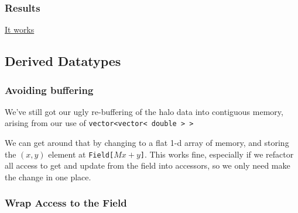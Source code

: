 \subsubsection{Results}\label{results}

\href{https://www.youtube.com/watch?v=3sXO2rYNwl4}{It works}

\subsection{Derived Datatypes}\label{derived-datatypes}

\subsubsection{Avoiding buffering}\label{avoiding-buffering}

We've still got our ugly re-buffering of the halo data into contiguous
memory, arising from our use of
\texttt{vector\textless{}vector\textless{} double \textgreater{} \textgreater{}}

We can get around that by changing to a flat 1-d array of memory, and
storing the $(x,y)$ element at \texttt{Field{[}}$Mx+y$\texttt{{]}}. This
works fine, especially if we refactor all access to get and update from
the field into accessors, so we only need make the change in one place.

\subsubsection{Wrap Access to the Field}\label{wrap-access-to-the-field}

\begin{Shaded}
\begin{Highlighting}[]

   \NormalTok{\{}
   
\NormalTok{\};}

   
\NormalTok{\}}

   
\NormalTok{\}}

   
   \NormalTok{)\{}
     \NormalTok{);}
  \NormalTok{\}}
\NormalTok{\}}
\end{Highlighting}
\end{Shaded}

